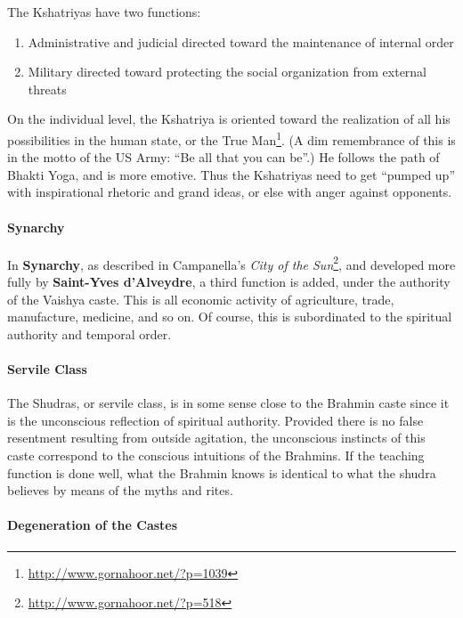 The Kshatriyas have two functions:

\begin{enumerate}


\item Administrative and judicial directed toward the maintenance of internal order

\item Military directed toward protecting the social organization from external threats
\end{enumerate}


On the individual level, the Kshatriya is oriented toward the realization of all his possibilities in the human state, or the True Man\footnote{\url{http://www.gornahoor.net/?p=1039}}. (A dim remembrance of this is in the motto of the US Army: ``Be all that you can be''.) He follows the path of Bhakti Yoga, and is more emotive. Thus the Kshatriyas need to get ``pumped up'' with inspirational rhetoric and grand ideas, or else with anger against opponents.

\paragraph{Synarchy}


In \textbf{Synarchy}, as described in Campanella's \textit{City of the Sun}\footnote{\url{http://www.gornahoor.net/?p=518}}, and developed more fully by \textbf{Saint-Yves d'Alveydre}, a third function is added, under the authority of the Vaishya caste. This is all economic activity of agriculture, trade, manufacture, medicine, and so on. Of course, this is subordinated to the spiritual authority and temporal order.

\paragraph{Servile Class}


The Shudras, or servile class, is in some sense close to the Brahmin caste since it is the unconscious reflection of spiritual authority. Provided there is no false resentment resulting from outside agitation, the unconscious instincts of this caste correspond to the conscious intuitions of the Brahmins. If the teaching function is done well, what the Brahmin knows is identical to what the shudra believes by means of the myths and rites.

\paragraph{Degeneration of the Castes}


